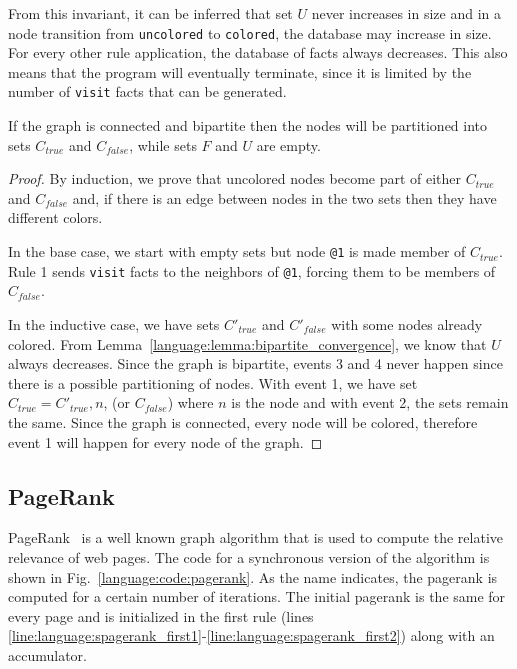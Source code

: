 From this invariant, it can be inferred that set $U$ never increases in size
and in a node transition from \texttt{uncolored} to \texttt{colored}, the
database may increase in size. For every other rule application, the database of
facts always decreases. This also means that the program will eventually
terminate, since it is limited by the number of \texttt{visit} facts that can be
generated.

\begin{theorem}
If the graph is connected and bipartite then the nodes will be partitioned into
sets $C_{true}$ and $C_{false}$, while sets $F$ and $U$ are empty.
\end{theorem}
\begin{proof}
   By induction, we prove that uncolored nodes become part of either $C_{true}$
   and $C_{false}$ and, if there is an edge between nodes in the two sets then
   they have different colors.

   In the base case, we start with empty sets but node \texttt{@1} is made
   member of $C_{true}$. Rule 1 sends \texttt{visit} facts to the neighbors of
   \texttt{@1}, forcing them to be members of $C_{false}$.

   In the inductive case, we have sets $C'_{true}$ and $C'_{false}$ with some
   nodes already colored. From Lemma~\ref{language:lemma:bipartite_convergence},
   we know that $U$ always decreases. Since the graph is bipartite, events 3 and
   4 never happen since there is a possible partitioning of nodes. With event 1,
   we have set $C_{true} = C'_{true}, n$, (or $C_{false}$) where $n$ is the
   node and with event 2, the sets remain the same. Since the graph is
   connected, every node will be colored, therefore event 1 will happen for
   every node of the graph.
\end{proof}

\subsection{PageRank}

PageRank~\cite{Page:2001:MNR} is a well known graph algorithm that is used to
compute the relative relevance of web pages.  The code for a synchronous version
of the algorithm is shown in Fig.~\ref{language:code:pagerank}. As the name
indicates, the pagerank is computed for a certain number of iterations. The
initial pagerank is the same for every page and is initialized in the first rule
(lines
\ref{line:language:spagerank_first1}-\ref{line:language:spagerank_first2}) along
with an accumulator.

